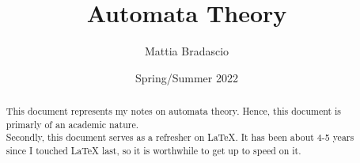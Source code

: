 \documentclass[12pt, letterpaper]{article}
\title{Automata Theory}
\author{Mattia Bradascio}
\date{Spring/Summer 2022}
\begin{document}
\begin{titlepage}
\maketitle
\end{titlepage}

\begin{abstract}

    This document represents my notes on automata theory.
    Hence, this document is primarly of an academic nature. \\ 
    \indent Secondly, this document serves as a refresher on LaTeX. 
    It has been about 4-5 years since I touched LaTeX last,
    so it is worthwhile to get up to speed on it.

\end{abstract}
\end{document}
